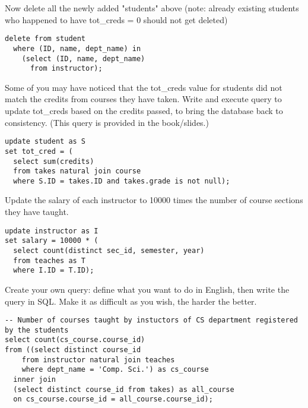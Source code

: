 \documentclass[logo,reportComp]{thesis}
\begin{document}
\begin{question}
\normalfont 
Now delete all the newly added "students" above (note: already existing students who happened to have tot\_creds = 0 should not get deleted)
\end{question}
\begin{answer}\mbox{}\par
\begin{lstlisting}
delete from student
  where (ID, name, dept_name) in
    (select (ID, name, dept_name)
      from instructor);
\end{lstlisting}
\end{answer}

\begin{question}
\normalfont 
Some of you may have noticed that the tot\_creds value for students did not match the credits from courses they have taken. Write and execute query to update tot\_creds based on the credits passed, to bring the database back to consistency. (This query is provided in the book/slides.)
\end{question}
\begin{answer}\mbox{}\par
\begin{lstlisting}
update student as S
set tot_cred = (
  select sum(credits)
  from takes natural join course
  where S.ID = takes.ID and takes.grade is not null);
\end{lstlisting}
\end{answer}

\begin{question}
\normalfont 
Update the salary of each instructor to 10000 times the number of course sections they have taught.
\end{question}
\begin{answer}\mbox{}\par
\begin{lstlisting}
update instructor as I
set salary = 10000 * (
  select count(distinct sec_id, semester, year)
  from teaches as T
  where I.ID = T.ID);
\end{lstlisting}
\end{answer}

\begin{question}
\normalfont 
Create your own query: define what you want to do in English, then write the query in SQL. Make it as difficult as you wish, the harder the better.
\end{question}
\begin{answer}\mbox{}\par
\begin{lstlisting}
-- Number of courses taught by instuctors of CS department registered by the students
select count(cs_course.course_id)
from ((select distinct course_id
    from instructor natural join teaches
    where dept_name = 'Comp. Sci.') as cs_course
  inner join
  (select distinct course_id from takes) as all_course
  on cs_course.course_id = all_course.course_id);
\end{lstlisting}
\end{answer}
\end{document}
